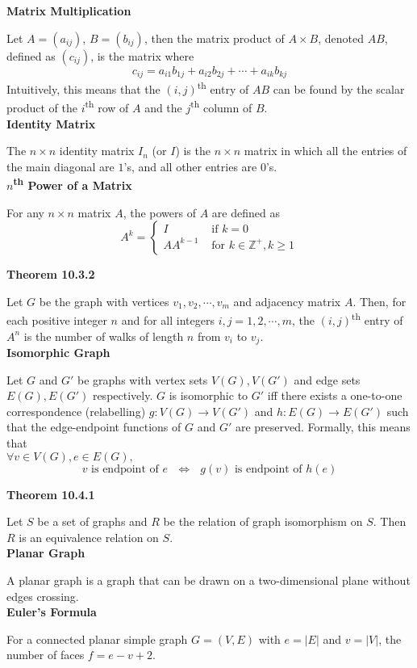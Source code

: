 \documentclass[a4paper]{article}
\newcommand{\subheading}[1]{{\scriptsize\textbf{#1}}}
\begin{document}
\begin{multicols*}{4}
\subheading{Matrix Multiplication}

Let $A = (a_{ij})$, $B = (b_{ij})$, then the matrix product of $A \times B$,
denoted $AB$, defined as $(c_{ij})$, is the matrix where
$$c_{ij} = a_{i1}b_{1j} + a_{i2}b_{2j} + \cdots + a_{ik}b_{kj}$$
Intuitively, this means that the $(i, j)$\textsuperscript{th} entry of $AB$ can
be found by the scalar product of the $i$\textsuperscript{th} row of $A$ and the
$j$\textsuperscript{th} column of $B$.\\

\subheading{Identity Matrix}

The $n \times n$ identity matrix $I_n$ (or $I$) is the $n \times n$ matrix in
which all the entries of the main diagonal are $1$'s, and all other entries are
$0$'s.\\

\subheading{$n$\textsuperscript{th} Power of a Matrix}

For any $n \times n$ matrix $A$, the powers of $A$ are defined as
$$A^k = \begin{cases}
  I & \text{ if $k=0$} \\
  AA^{k-1} & \text{ for $k \in \mathbb{Z}^+, k \geq 1$}
\end{cases}$$

\subheading{Theorem 10.3.2}

Let $G$ be the graph with vertices $v_1, v_2, \cdots, v_m$ and adjacency matrix
$A$. Then, for each positive integer $n$ and for all integers $i, j = 1, 2,
\cdots, m$, the $(i, j)$\textsuperscript{th} entry of $A^n$ is the number of
walks of length $n$ from $v_i$ to $v_j$.\\

\subheading{Isomorphic Graph}

Let $G$ and $G'$ be graphs with vertex sets $V(G), V(G')$ and edge sets $E(G),
E(G')$ respectively. $G$ is isomorphic to $G'$ iff there exists a one-to-one
correspondence (relabelling) $g: V(G) \rightarrow V(G')$ and $h: E(G)
\rightarrow E(G')$ such that the edge-endpoint functions of $G$ and $G'$ are
preserved. Formally, this means that\\

\hspace{0.5em}$\forall v \in V(G), e \in E(G),$
$$\text{$v$ is endpoint of $e$ $\iff$ $g(v)$ is endpoint of $h(e)$}$$

\subheading{Theorem 10.4.1}

Let $S$ be a set of graphs and $R$ be the relation of graph isomorphism on $S$.
Then $R$ is an equivalence relation on $S$.\\

\subheading{Planar Graph}

A planar graph is a graph that can be drawn on a two-dimensional plane without
edges crossing.\\

\subheading{Euler's Formula}

For a connected planar simple graph $G = (V, E)$ with $e = |E|$ and $v = |V|$,
the number of faces $f = e - v + 2$.

\end{multicols*}
\end{document}
